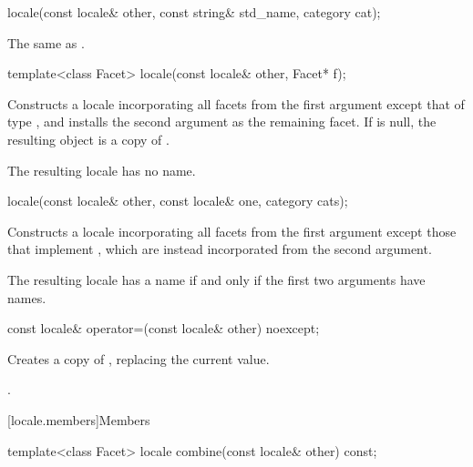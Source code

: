 %
\begin{itemdecl}
locale(const locale& other, const string& std_name, category cat);
\end{itemdecl}

\begin{itemdescr}
\pnum
\effects
The same as .
\end{itemdescr}

%
\begin{itemdecl}
template<class Facet> locale(const locale& other, Facet* f);
\end{itemdecl}

\begin{itemdescr}
\pnum
\effects
Constructs a locale incorporating all facets from the first argument
except that of type ,
and installs the second argument as the remaining facet.
If  is null, the resulting object is a copy of .

\pnum
\remarks
The resulting locale has no name.
\end{itemdescr}

%
\begin{itemdecl}
locale(const locale& other, const locale& one, category cats);
\end{itemdecl}

\begin{itemdescr}
\pnum
\effects
Constructs a locale incorporating all facets from the first argument
except those that implement ,
which are instead incorporated from the second argument.

\pnum
\remarks
The resulting locale has a name if and only if
the first two arguments have names.
\end{itemdescr}

%
\begin{itemdecl}
const locale& operator=(const locale& other) noexcept;
\end{itemdecl}

\begin{itemdescr}
\pnum
\effects
Creates a copy of , replacing the current value.

\pnum
\returns
{}.
\end{itemdescr}

[locale.members]{Members}

%
\begin{itemdecl}
template<class Facet> locale combine(const locale& other) const;
\end{itemdecl}

